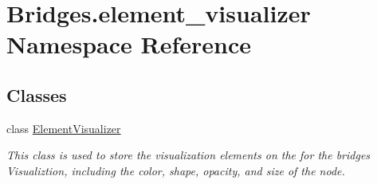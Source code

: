 \hypertarget{namespace_bridges_1_1element__visualizer}{}\section{Bridges.\+element\+\_\+visualizer Namespace Reference}
\label{namespace_bridges_1_1element__visualizer}
\subsection*{Classes}
\begin{DoxyCompactItemize}
\item 
class \mbox{\hyperlink{class_bridges_1_1element__visualizer_1_1_element_visualizer}{Element\+Visualizer}}
\begin{DoxyCompactList}\small\item\em This class is used to store the visualization elements on the for the bridges Visualiztion, including the color, shape, opacity, and size of the node. \end{DoxyCompactList}\end{DoxyCompactItemize}
